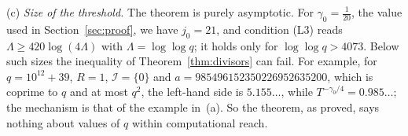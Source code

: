 \begin{remark}
(c) \emph{Size of the threshold.} The theorem is purely asymptotic. For $\gamma_0=\frac1{20}$, the value used in Section~\ref{sec:proof}, we have $j_0=21$, and condition (L3) reads $\Lambda\ge420\log(4\Lambda)$ with $\Lambda=\log\log q$; it holds only for $\log\log q>4073$. Below such sizes the inequality of Theorem~\ref{thm:divisors} can fail. For example, for $q=10^{12}+39$, $R=1$, $\mathcal I=\{0\}$ and $a=985496152350226952635200$, which is coprime to $q$ and at most $q^2$, the left-hand side is $5.155\ldots$, while $T^{-\gamma_0/4}=0.985\ldots$; the mechanism is that of the example in~(a). So the theorem, as proved, says nothing about values of $q$ within computational reach.
\end{remark}
